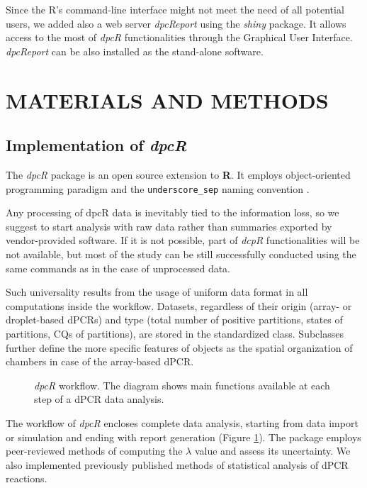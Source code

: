 \documentclass[a4,center,fleqn]{NAR}
\begin{document}
Since the R's command-line interface might not meet the need of all potential 
users, we added also a web server \textit{dpcReport} using the \textit{shiny} 
package. It allows access to the most of \textit{dpcR} functionalities through 
the Graphical User Interface. \textit{dpcReport} can be also installed as the 
stand-alone software.

\section{MATERIALS AND METHODS}

\subsection{Implementation of \textit{dpcR}}

The \textit{dpcR} package is an open source extension to \textbf{R}. It 
employs object-oriented programming paradigm and the \texttt{underscore\_sep} 
naming convention \cite{Baaaath_2012}.

Any processing of dpcR data is inevitably tied to the information loss, so we 
suggest to start analysis with raw data rather than summaries exported by 
vendor-provided software. If it is not possible, part of \textit{dcpR} 
functionalities will be not available, but most of the study can be still 
successfully conducted using the same commands as in the case of unprocessed 
data. 

Such universality results from the usage of uniform data format in all 
computations inside the workflow. Datasets, regardless of their origin (array- 
or droplet-based dPCRs) and type (total number of positive partitions, states of 
partitions, CQs of partitions), are stored in the standardized class. Subclasses 
further define the more specific features of objects as the spatial organization 
of chambers in case of the array-based dPCR.

\begin{figure}[t]
\begin{center}
\end{center}
\caption{\textit{dpcR} workflow. The diagram shows main functions 
available at each step of a dPCR data analysis.}
\label{workflow}
\end{figure}

The workflow of \textit{dpcR} encloses complete data analysis, starting from 
data import or simulation and ending with report generation (Figure 
\ref{workflow}). The package employs peer-reviewed methods of computing the 
$\lambda$ value and assess its uncertainty. We also implemented previously 
published methods of statistical analysis of dPCR reactions.
\end{document}
